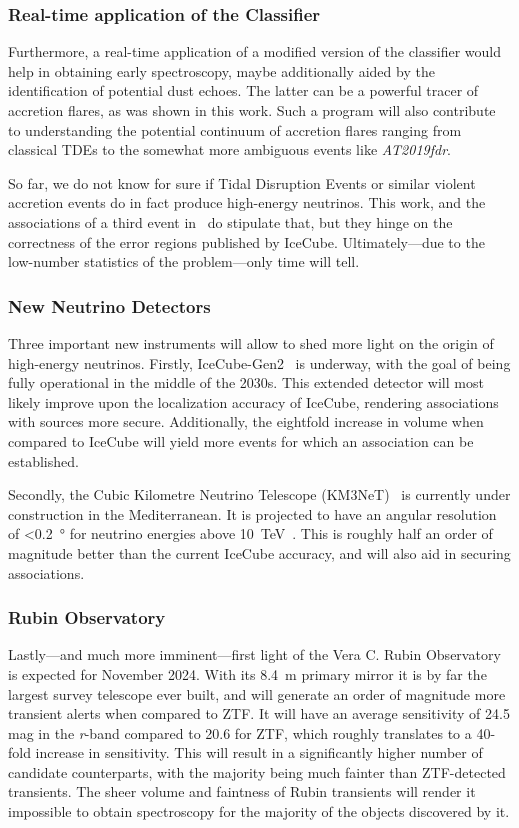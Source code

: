 \subsubsection{Real-time application of the Classifier}
Furthermore, a real-time application of a modified version of the classifier would help in obtaining early spectroscopy, maybe additionally aided by the identification of potential dust echoes. The latter can be a powerful tracer of accretion flares, as was shown in this work. Such a program will also contribute to understanding the potential continuum of accretion flares ranging from classical TDEs to the somewhat more ambiguous events like \textit{AT2019fdr}.

So far, we do not know for sure if Tidal Disruption Events or similar violent accretion events do in fact produce high-energy neutrinos. This work, and the associations of a third event in~\cite{Velzen2021} do stipulate that, but they hinge on the correctness of the error regions published by IceCube. Ultimately---due to the low-number statistics of the problem---only time will tell.

\subsubsection{New Neutrino Detectors}
Three important new instruments will allow to shed more light on the origin of high-energy neutrinos. Firstly, IceCube-Gen2~ is underway, with the goal of being fully operational in the middle of the 2030s. This extended detector will most likely improve upon the localization accuracy of IceCube, rendering associations with sources more secure. Additionally, the eightfold increase in volume when compared to IceCube will yield more events for which an association can be established.

Secondly, the Cubic Kilometre Neutrino Telescope (KM3NeT)~ is currently under construction in the Mediterranean. It is projected to have an angular resolution of \SI{<0.2}{\degree} for neutrino energies above \SI{10}{\tera\eV}~. This is roughly half an order of magnitude better than the current IceCube accuracy, and will also aid in securing associations.

\subsubsection{Rubin Observatory}
Lastly---and much more imminent---first light of the Vera C. Rubin Observatory~\cite{Ivezic2019} is expected for November 2024. With its \SI{8.4}{\m} primary mirror it is by far the largest survey telescope ever built, and will generate an order of magnitude more transient alerts when compared to ZTF. It will have an average sensitivity of 24.5 mag in the \textit{r}-band compared to 20.6 for ZTF, which roughly translates to a 40-fold increase in sensitivity. This will result in a significantly higher number of candidate counterparts, with the majority being much fainter than ZTF-detected transients. The sheer volume and faintness of Rubin transients will render it impossible to obtain spectroscopy for the majority of the objects discovered by it.

